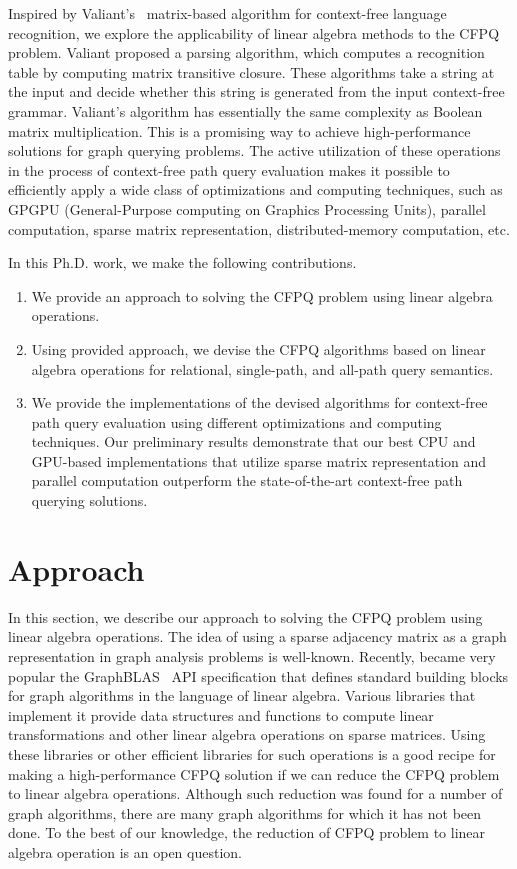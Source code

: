 \documentclass[sigconf, nonacm]{acmart}
\begin{document}
Inspired by Valiant's~\cite{valiant} matrix-based algorithm for context-free language recognition, we explore the applicability of linear algebra methods to the CFPQ problem. Valiant proposed a parsing algorithm, which computes a recognition table by computing matrix transitive closure. These algorithms take a string
at the input and decide whether this string is generated from the
input context-free grammar. Valiant’s algorithm has essentially the same complexity as Boolean matrix multiplication. This is a promising way to achieve high-performance solutions for graph querying problems. The active utilization of these operations in the process of context-free path query evaluation
makes it possible to efficiently apply a wide class of optimizations
and computing techniques, such as GPGPU (General-Purpose computing on Graphics Processing Units), parallel computation, sparse
matrix representation, distributed-memory computation, etc.

In this Ph.D. work, we make the following contributions.
\begin{enumerate}
	\item We provide an approach to solving the CFPQ problem using linear algebra operations.
	
	\item Using provided approach, we devise the CFPQ algorithms based on linear algebra operations for relational, single-path, and all-path query semantics.
	
	\item We provide the implementations of the devised algorithms for context-free path query evaluation using different optimizations	and computing techniques. Our preliminary results demonstrate that our best CPU and GPU-based implementations that utilize sparse matrix representation and parallel computation outperform the state-of-the-art context-free path querying solutions.
\end{enumerate}

\section{Approach}

In this section, we describe our approach to solving the CFPQ problem using linear algebra operations. The idea of using a sparse adjacency matrix as a graph representation in graph analysis problems is well-known. Recently, became very popular the GraphBLAS~\cite{7761646} API specification that defines standard building blocks for graph algorithms in the language of linear algebra. Various libraries that implement it provide data structures and functions to compute linear transformations and other linear algebra operations on sparse matrices. Using these libraries or other efficient libraries for such operations is a good recipe for making a high-performance CFPQ solution if we can reduce the CFPQ problem to linear algebra operations. Although such reduction was found for a number of graph algorithms, there are many graph algorithms for which it has not been done. To the best of our knowledge, the reduction of CFPQ problem to linear algebra operation is an open question.
\end{document}
